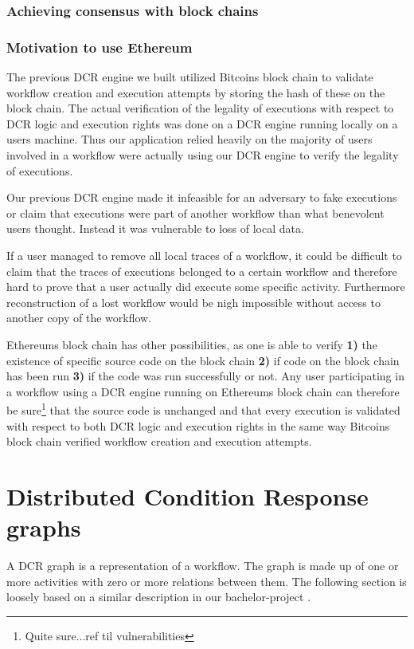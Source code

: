 \documentclass{article}
\begin{document}
	\subsubsection{Achieving consensus with block chains}

	\subsubsection{Motivation to use Ethereum}
	The previous DCR engine we built utilized Bitcoins block chain to validate workflow creation and execution attempts by storing the hash of these on the block chain.
	The actual verification of the legality of executions with respect to DCR logic and execution rights was done on a DCR engine running locally on a users machine.
	Thus our application relied heavily on the majority of users involved in a workflow were actually using our DCR engine to verify the legality of executions. 

	Our previous DCR engine made it infeasible for an adversary to fake executions or claim that executions were part of another workflow than what benevolent users thought.
	Instead it was vulnerable to loss of local data. 
	
	If a user managed to remove all local traces of a workflow, it could be difficult to claim that the traces of executions belonged to a certain workflow and therefore hard to prove that a user actually did execute some specific activity. Furthermore reconstruction of a lost workflow would be nigh impossible without access to another copy of the workflow.

	Ethereums block chain has other possibilities, as one is able to verify \textbf{1)} the existence of specific source code on the block chain \textbf{2)} if code on the block chain has been run \textbf{3)} if the code was run successfully or not.
	Any user participating in a workflow using a DCR engine running on Ethereums block chain can therefore be sure\footnote{Quite sure...ref til vulnerabilities} that the source code is unchanged and that every execution is validated with respect to both DCR logic and execution rights in the same way Bitcoins block chain verified workflow creation and execution attempts.

	\section{Distributed Condition Response graphs}
	A DCR graph is a representation of a workflow. 
	The graph is made up of one or more activities with zero or more relations between them. 
	The following section is loosely based on a similar description in our bachelor-project \cite{bachelor}. 
\end{document}
